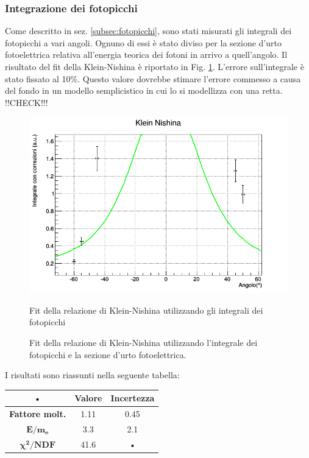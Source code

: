 \documentclass[8pt]{extarticle}
\begin{document}
\subsubsection{Integrazione dei fotopicchi}
Come descritto in sez. \ref{subsec:fotopicchi}, sono stati misurati gli integrali dei fotopicchi a vari angoli. Ognuno di essi è stato diviso per la sezione d'urto fotoelettrica relativa all'energia teorica dei fotoni in arrivo a quell'angolo. Il risultato del fit della Klein-Nishina è riportato in Fig. \ref{fig:KN_fotopicchi}. L'errore sull'integrale è stato fissato al 10\%. Questo valore dovrebbe stimare l'errore commesso a causa del fondo in un modello semplicistico in cui lo si modellizza con una retta. !!CHECK!!!

\begin{figure}
\begin{center}
\includegraphics[scale=0.5]{integrali_fotopicco}
\caption{Fit della relazione di Klein-Nishina utilizzando gli integrali dei fotopicchi}
\label{fig:KN_fotopicchi}
\caption{Fit della relazione di Klein-Nishina utilizzando l'integrale dei fotopicchi e la sezione d'urto fotoelettrica.}
\end{center}
\end{figure}

I risultati sono riassunti nella seguente tabella: \\

\begin{center}
\begin{tabular}{|c|c|c|}
\hline 
• & \textbf{Valore} & \textbf{Incertezza} \\ 
\hline 
\textbf{Fattore molt.} & 1.11 & 0.45 \\ 
\hline 
$\mathbf{E/m_e}$ & 3.3 & 2.1 \\ 
\hline 
$\mathbf{\chi^2/NDF}$ & 41.6 & • \\ 
\hline 
\end{tabular} 
\end{center}
\end{document}
